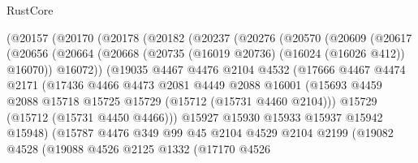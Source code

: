 \begin{lexlean}{RustCore}
\begin{coremodule}
              (@20157
                (@20170
                  (@20178
                    (@20182
                      (@20237
                        (@20276
                          (@20570
                            (@20609
                              (@20617
                                (@20656
                                  (@20664
                                    (@20668 (@20735 (@16019 @20736) (@16024 (@16026 @412)) @16070))
                                    @16072))
                                (@19035
                                  @4467
                                  @4476
                                  @2104
                                  @4532
                                  (@17666
                                    @4467
                                    @4474
                                    @2171
                                    (@17436
                                      @4466
                                      @4473
                                      @2081
                                      @4449
                                      @2088
                                      @16001
                                      (@15693
                                        @4459
                                        @2088
                                        @15718
                                        @15725
                                        @15729
                                        (@15712 (@15731 @4460 @2104)))
                                      @15729
                                      (@15712 (@15731 @4450 @4466)))
                                    @15927
                                    @15930
                                    @15933
                                    @15937
                                    @15942
                                    @15948)
                                  (@15787
                                    @4476
                                    @349
                                    @99
                                    @45
                                    @2104
                                    @4529
                                    @2104
                                    @2199
                                    (@19082
                                      @4528
                                      (@19088
                                        @4526
                                        @2125
                                        @1332
                                        (@17170
                                          @4526

\end{coremodule}
\end{lexlean}
